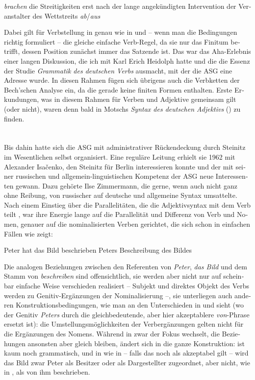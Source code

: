 \documentclass[output=paper,colorlinks,citecolor=brown]{langscibook}
\begin{document}
\begin{otherlanguage}{german}
\ea \textit{brachen} die Streitigkeiten erst nach der lange angekündigten Intervention der Veranstalter des Wettstreits \textit{ab}/\textit{aus}
\label{ex:5}
\z

\noindent Dabei gilt für Verbstellung in  genau wie in  und  -- wenn man die Bedingungen richtig formuliert -- die gleiche einfache Verb-Regel, da sie nur das Finitum betrifft, dessen Position zunächst immer das Satzende ist. Das war das Aha-Erlebnis einer langen Diskussion, die ich mit Karl Erich Heidolph hatte und die die Essenz der Studie \textit{Grammatik des deutschen Verbs} \citep{Bierwisch1963} ausmacht, mit der die ASG eine Adresse wurde. In diesen Rahmen fügen sich übrigens auch die Verbketten der Bech'schen Analyse ein, da die gerade keine finiten Formen enthalten. Erste Erkundungen, was in diesem Rahmen für Verben und Adjektive gemeinsam gilt (oder nicht), waren denn bald in Motschs \textit{Syntax des deutschen Adjektivs} (\citeyear{Motsch1964}) zu finden.

\section{}\label{sec:2}

Bis dahin hatte sich die ASG mit administrativer Rückendeckung durch Steinitz im Wesentlichen selbst organisiert. Eine reguläre Leitung erhielt sie 1962 mit Alexander Isačenko, den Steinitz für Berlin interessieren konnte und der mit seiner russischen und allgemein-linguistischen Kompetenz der ASG neue Interessenten gewann. Dazu gehörte Ilse Zimmermann, die gerne, wenn auch nicht ganz ohne Reibung, von russischer auf deutsche und allgemeine Syntax umsattelte. Nach einem Einstieg über die Parallelitäten, die die Adjektivsyntax mit dem Verb teilt \citep{Zimmermann1967}, war ihre Energie lange auf die Parallelität und Differenz von Verb und Nomen, genauer auf die nominalisierten Verben gerichtet, die sich schon in einfachen Fällen wie  zeigt:

\ea
\ea Peter hat das Bild beschrieben
\ex Peters Beschreibung des Bildes
\z
\label{ex:6}
\z

\noindent Die analogen Beziehungen zwischen den Referenten von \textit{Peter}, \textit{das Bild} und dem Stamm von \textit{beschreiben} sind offensichtlich, sie werden aber nicht nur auf scheinbar einfache Weise verschieden realisiert -- Subjekt und direktes Objekt des Verbs werden zu Genitiv-Ergänzungen der Nominalisierung --, sie unterliegen auch anderen Konstruktionsbedingungen, wie man an den Unterschieden in  und  sieht (wo der Genitiv \textit{Peters} durch die gleichbedeutende, aber hier akzeptablere \textit{von}-Phrase ersetzt ist): die Umstellungsmöglichkeiten der Verbergänzungen gelten nicht für die Ergänzungen des Nomens. Während in  zwar der Fokus wechselt, die Beziehungen ansonsten aber gleich bleiben, ändert sich in  die ganze Konstruktion:  ist kaum noch grammatisch, und in  wie in  -- falls das noch als akzeptabel gilt -- wird das Bild zwar Peter als Besitzer oder als Dargestellter zugeordnet, aber nicht, wie in , als von ihm beschrieben.


\end{otherlanguage}
\end{document}
